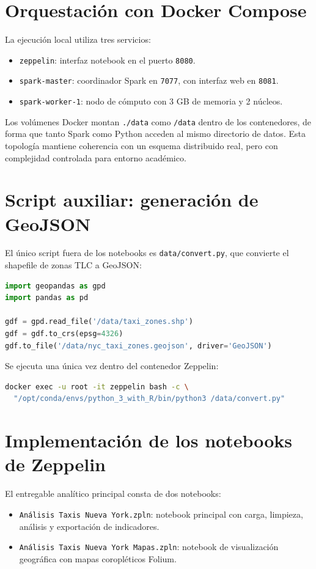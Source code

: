 \section{Orquestación con Docker Compose}
La ejecución local utiliza tres servicios:
\begin{itemize}
	\item \texttt{zeppelin}: interfaz notebook en el puerto \texttt{8080}.
	\item \texttt{spark-master}: coordinador Spark en \texttt{7077},
	con interfaz web en \texttt{8081}.
	\item \texttt{spark-worker-1}: nodo de cómputo con 3 GB de memoria
	y 2 núcleos.
\end{itemize}

Los volúmenes Docker montan \texttt{./data} como \texttt{/data} dentro de los
contenedores, de forma que tanto Spark como Python acceden al mismo directorio
de datos. Esta topología mantiene coherencia con un esquema distribuido real,
pero con complejidad controlada para entorno académico.

\section{Script auxiliar: generación de GeoJSON}
El único script fuera de los notebooks es \texttt{data/convert.py}, que convierte
el shapefile de zonas TLC a GeoJSON:

\begin{lstlisting}[language=python,caption={Script de conversión shapefile a GeoJSON}]
import geopandas as gpd
import pandas as pd

gdf = gpd.read_file('/data/taxi_zones.shp')
gdf = gdf.to_crs(epsg=4326)
gdf.to_file('/data/nyc_taxi_zones.geojson', driver='GeoJSON')
\end{lstlisting}

Se ejecuta una única vez dentro del contenedor Zeppelin:
\begin{lstlisting}[language=bash,caption={Ejecución del script de conversión}]
docker exec -u root -it zeppelin bash -c \
  "/opt/conda/envs/python_3_with_R/bin/python3 /data/convert.py"
\end{lstlisting}

\section{Implementación de los notebooks de Zeppelin}
El entregable analítico principal consta de dos notebooks:
\begin{itemize}
	\item \texttt{Análisis Taxis Nueva York.zpln}: notebook principal con carga,
	limpieza, análisis y exportación de indicadores.
	\item \texttt{Análisis Taxis Nueva York Mapas.zpln}: notebook de visualización
	geográfica con mapas coropléticos Folium.
\end{itemize}

